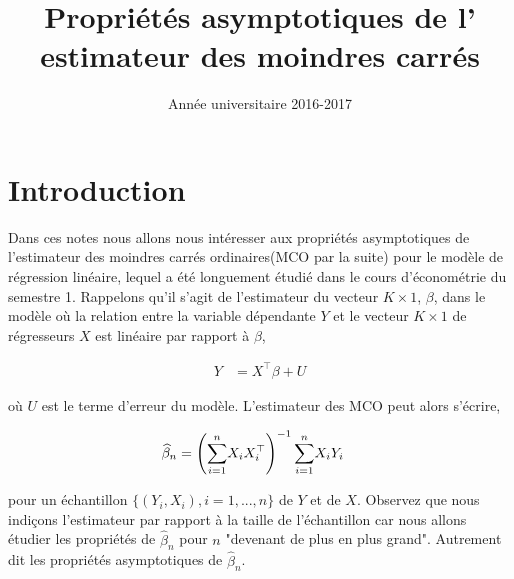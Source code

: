 \documentclass[12pt, reqno]{amsart}
\title{Propriétés asymptotiques de  l' estimateur des moindres carrés}
\date{Année universitaire 2016-2017}
\begin{document}
\maketitle
\section{Introduction}
Dans ces notes nous allons nous intéresser aux propriétés asymptotiques de l'estimateur des moindres carrés ordinaires(MCO par la suite) pour le modèle de régression linéaire, lequel a été longuement étudié dans le cours d'économétrie du semestre 1.
Rappelons qu'il s'agit de l'estimateur du vecteur $K\times 1$, $\beta$, dans le modèle où la relation entre la variable dépendante $Y$ et le vecteur $K\times 1$ de régresseurs $X$ est linéaire par rapport à $\beta$,

\begin{align*}
Y &=X^\top\beta +U
\end{align*}

où $U$ est le terme d'erreur du modèle. L'estimateur des MCO peut alors s'écrire,

\begin{align*}
\widehat{\beta}_n &= \left(\underset{i=1}{\overset{n}{\sum}} X_iX_i^\top\right)^{-1}\underset{i=1}{\overset{n}{\sum}} X_iY_i
\end{align*}

pour un échantillon $\{(Y_i, X_i), i = 1,...,n\}$ de $Y$ et de $X$. Observez que nous indiçons l'estimateur par rapport à la taille de l'échantillon car nous allons étudier les propriétés de $\widehat{\beta}_n $ pour $n$ "devenant de plus en plus grand". Autrement dit les propriétés asymptotiques de $\widehat{\beta}_n$.
\end{document}
